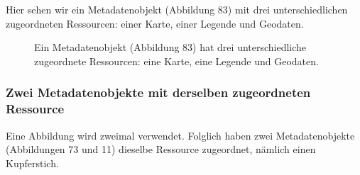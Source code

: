\documentclass[
  letterpaper,
  DIV=11,
  numbers=noendperiod]{scrartcl}
\begin{document}
Hier sehen wir ein Metadatenobjekt (Abbildung 83) mit drei
unterschiedlichen zugeordneten Ressourcen: einer Karte, einer Legende
und Geodaten.

\begin{figure}


\caption{\label{fig-metadata-3}Ein Metadatenobjekt (Abbildung 83) hat
drei unterschiedliche zugeordnete Ressourcen: eine Karte, eine Legende
und Geodaten.}

\end{figure}%

\subsubsection{Zwei Metadatenobjekte mit derselben zugeordneten
Ressource}\label{zwei-metadatenobjekte-mit-derselben-zugeordneten-ressource}

Eine Abbildung wird zweimal verwendet. Folglich haben zwei
Metadatenobjekte (Abbildungen 73 und 11) dieselbe Ressource zugeordnet,
nämlich einen Kupferstich.
\end{document}
